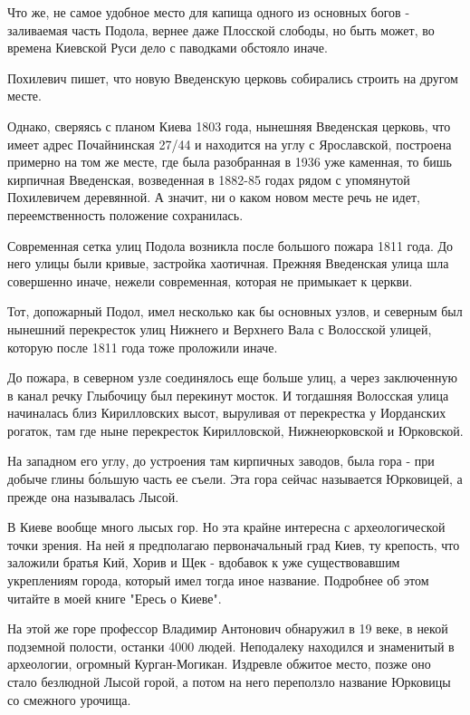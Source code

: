 \documentclass[a5paper,11pt,openany]{article}
\begin{document}
   Что же, не самое удобное место для капища одного из основных богов - заливаемая часть Подола, вернее даже Плосской слободы, но быть может, во времена Киевской Руси дело с паводками обстояло иначе. 

    Похилевич пишет, что новую Введенскую церковь собирались строить на другом месте.

   Однако, сверяясь с планом Киева 1803 года,
нынешняя Введенская церковь, что имеет адрес Почайнинская 27/44 и находится на углу с Ярославской, построена примерно на том же месте, где была разобранная в 1936 уже каменная, то бишь кирпичная Введенская, возведенная в 1882-85 годах рядом с упомянутой Похилевичем деревянной. А значит, ни о каком новом месте речь не идет, переемственность положение сохранилась.

   Современная сетка улиц Подола возникла после большого пожара 1811 года. До него улицы были кривые, застройка хаотичная. Прежняя Введенская улица шла совершенно иначе, нежели современная, которая не примыкает к церкви.

   Тот, допожарный Подол, имел несколько как бы основных узлов, и северным был нынешний перекресток улиц Нижнего и Верхнего Вала с Волосской улицей, которую после 1811 года тоже проложили иначе. 

   До пожара, в северном узле соединялось еще больше улиц, а через заключенную в канал речку Глыбочицу был перекинут мосток. И тогдашняя Волосская улица начиналась близ Кирилловских высот, выруливая от перекрестка у Иорданских рогаток, там где ныне перекресток Кирилловской, Нижнеюрковской и Юрковской.

   На западном его углу, до устроения там кирпичных заводов, была гора - при добыче глины б\'ольшую часть ее съели. Эта гора сейчас называется Юрковицей, а прежде она называлась Лысой. 

   В Киеве вообще много лысых гор. Но эта крайне интересна с археологической точки зрения. На ней я предполагаю первоначальный град Киев, ту крепость, что заложили братья Кий, Хорив и Щек - вдобавок к уже существовавшим укреплениям города, который имел тогда иное название. Подробнее об этом читайте в моей книге "Ересь о Киеве".

   На этой же горе профессор Владимир Антонович обнаружил в 19 веке, в некой подземной полости, останки 4000 людей. Неподалеку находился и знаменитый в археологии, огромный Курган-Могикан. Издревле обжитое место, позже оно стало безлюдной Лысой горой, а потом на него переползло название Юрковицы со смежного урочища.
\end{document}
